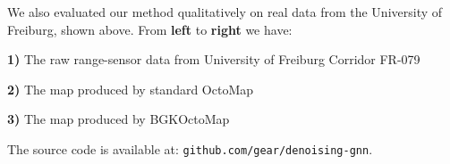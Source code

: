 \documentclass[portrait,final,archD,fontscale=0.477]{baposter}
\begin{document}
\begin{poster}
{We also evaluated our method qualitatively on real data from the University of Freiburg, shown above. From \textbf{left} to \textbf{right} we have:

\textbf{1)} The raw range-sensor data from University of Freiburg Corridor FR-079

\textbf{2)} The map produced by standard OctoMap

\textbf{3)} The map produced by BGKOctoMap

\vspace{0.1em}

\setlength{\columnsep}{0.1em}
\vspace{0.1em}
\begin{multicols}{2}

\noindent
The source code is available at: \texttt{github.com/gear/denoising-gnn}.

\end{multicols}

}


\end{poster}
\end{document}
